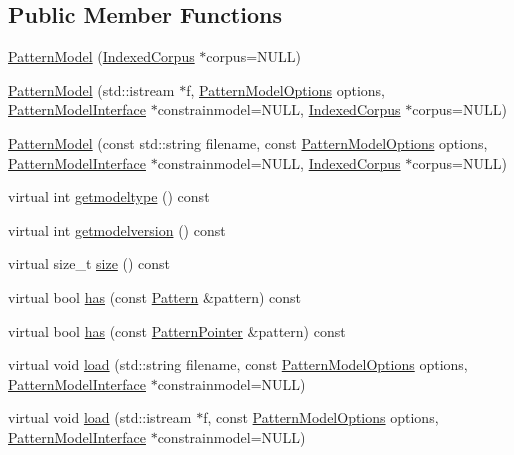 \subsection*{Public Member Functions}
\begin{DoxyCompactItemize}
\item 
\hyperlink{classPatternModel_ade6d8f3c3bae062c06881d96809ea4ff}{Pattern\+Model} (\hyperlink{classIndexedCorpus}{Indexed\+Corpus} $\ast$corpus=N\+U\+L\+L)
\item 
\hyperlink{classPatternModel_a9f1e66e0893ead99e75013cb578cd54a}{Pattern\+Model} (std\+::istream $\ast$f, \hyperlink{classPatternModelOptions}{Pattern\+Model\+Options} options, \hyperlink{classPatternModelInterface}{Pattern\+Model\+Interface} $\ast$constrainmodel=N\+U\+L\+L, \hyperlink{classIndexedCorpus}{Indexed\+Corpus} $\ast$corpus=N\+U\+L\+L)
\item 
\hyperlink{classPatternModel_afd68d5b590a3b477f7fdee2921755a44}{Pattern\+Model} (const std\+::string filename, const \hyperlink{classPatternModelOptions}{Pattern\+Model\+Options} options, \hyperlink{classPatternModelInterface}{Pattern\+Model\+Interface} $\ast$constrainmodel=N\+U\+L\+L, \hyperlink{classIndexedCorpus}{Indexed\+Corpus} $\ast$corpus=N\+U\+L\+L)
\item 
virtual int \hyperlink{classPatternModel_aadea1e70400eb2aeced1ca1648cf9cd9}{getmodeltype} () const 
\item 
virtual int \hyperlink{classPatternModel_ac2f98f98d449951caa82894be78e9fe6}{getmodelversion} () const 
\item 
virtual size\+\_\+t \hyperlink{classPatternModel_a25f387acaf981af9962195bd05b3e7e2}{size} () const 
\item 
virtual bool \hyperlink{classPatternModel_a577eb056f583b4efc943ac4e7a581b1b}{has} (const \hyperlink{classPattern}{Pattern} \&pattern) const 
\item 
virtual bool \hyperlink{classPatternModel_af94a590e3c5eacde04cb55430198acfa}{has} (const \hyperlink{classPatternPointer}{Pattern\+Pointer} \&pattern) const 
\item 
virtual void \hyperlink{classPatternModel_a26de418f6998cac0f484a958597afccc}{load} (std\+::string filename, const \hyperlink{classPatternModelOptions}{Pattern\+Model\+Options} options, \hyperlink{classPatternModelInterface}{Pattern\+Model\+Interface} $\ast$constrainmodel=N\+U\+L\+L)
\item 
virtual void \hyperlink{classPatternModel_acbfb81964c7a6eb13d846dc11d2cc667}{load} (std\+::istream $\ast$f, const \hyperlink{classPatternModelOptions}{Pattern\+Model\+Options} options, \hyperlink{classPatternModelInterface}{Pattern\+Model\+Interface} $\ast$constrainmodel=N\+U\+L\+L)

\end{DoxyCompactItemize}
